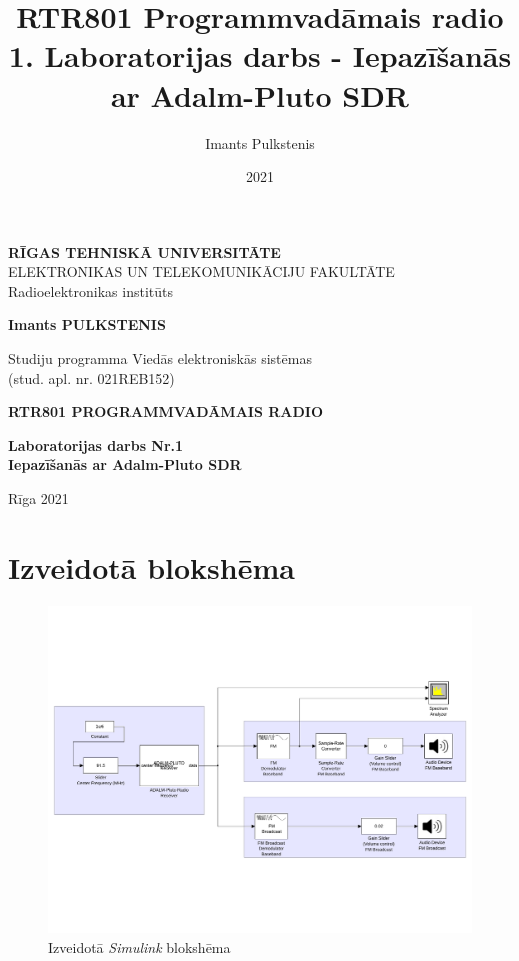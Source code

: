 \documentclass[a4paper,12pt]{extarticle}    %
\author{Imants Pulkstenis}
\title{RTR801 Programmvadāmais radio 1. Laboratorijas darbs - Iepazīšanās ar Adalm-Pluto SDR}
\date{2021}
\begin{document}
\begin{titlepage}
	\centering
	{ \normalsize \textbf{\uppercase{Rīgas  Tehniskā  Universitāte} }\\
	 \uppercase{Elektronikas un Telekomunikāciju fakultāte}\\
	 Radioelektronikas institūts
	 \par}
	\vspace{3cm}
	{\Large \textbf{Imants PULKSTENIS}\par}

	{\large Studiju programma Viedās elektroniskās sistēmas\\}
	{\Large (stud. apl. nr. 021REB152)\\}
	\vspace{3cm}
	{\Large \textbf{ \uppercase{RTR801 Programmvadāmais radio}}\par}
	{\large \textbf{Laboratorijas darbs Nr.1}\\}
	{\large \textbf{Iepazīšanās ar Adalm-Pluto SDR}\\}
	\vfill
	
	\vfill

	{\begin{center}
		\large Rīga 2021
	\end{center} }
\end{titlepage}
%
\section{Izveidotā blokshēma}
%
\begin{figure}[H]
  	 \centering
  		\includegraphics[trim={0cm 4.5cm 0cm 4.5cm},clip, angle=0, width=0.99\linewidth ]{pictures/lab1.pdf}
  		\caption{Izveidotā \textit{Simulink} blokshēma}\label{fig:blokshama}
\end{figure}
%
\end{document}
